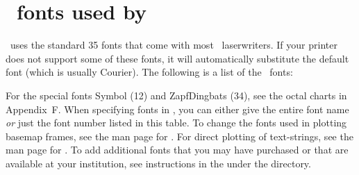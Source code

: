 %
%
\chapter{\PS\ fonts used by \gmt}
\label{app:G}
\thispagestyle{headings}

\GMT\ uses the standard 35 fonts that come with most
\PS\ laserwriters.  If your printer does not support
some of these fonts, it will automatically substitute the
default font (which is usually Courier).  The following is
a list of the \GMT\ fonts: \\ 


For the special fonts Symbol (12) and ZapfDingbats (34), see the
octal charts in Appendix~F.  When specifying fonts in \GMT, you can
either give the entire font name \emph{or} just the font number listed in
this table.  To change the fonts used in plotting basemap frames, see the man
page for .  For direct plotting of text-strings,
see the man page for .  To add additional fonts that you
may have purchased or that are available at your institution, see instructions
in the  under the  directory.
